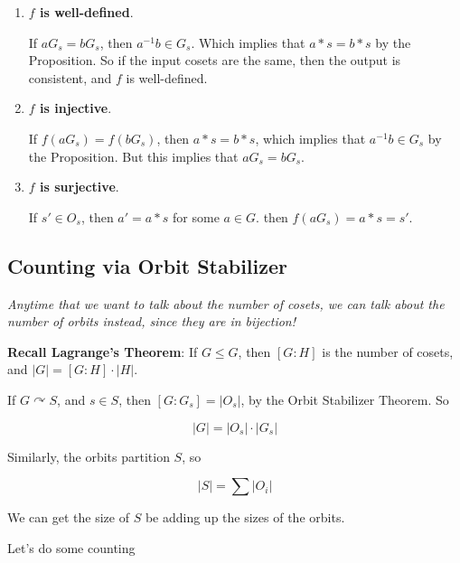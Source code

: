 \documentclass[12pt]{article}
\def\acts{\curvearrowright}
\begin{document}
\begin{enumerate}
  \item {\bf $f$ is  well-defined}.

    If $aG_s = b G_s$, then $a^{-1} b \in G_s$. Which implies that $a * s = b *
    s$ by the Proposition. So if the input cosets are the same, then the output
    is consistent, and $f$ is well-defined.

  \item {\bf $f$ is injective}.

    If $f(aG_s) = f(b G_s)$, then $a * s = b * s$, which implies that $a^{-1}b
    \in G_s$ by the Proposition. But this implies that $aG_s = b G_s$.

  \item {\bf $f$ is surjective}.

    If $s' \in O_s$, then $a' = a * s$ for some $a \in G$. then $f(a G_s) = a *
    s = s'$.
\end{enumerate}

\subsection{Counting via Orbit Stabilizer}

{\it Anytime that we want to talk about the number of cosets, we can talk about the
number of orbits instead, since they are in bijection!}

{\bf Recall Lagrange's Theorem}: If $G \le G$, then $[G : H]$ is the number of
cosets, and $|G| = [G : H] \cdot |H|$.

If $G \acts S$, and $s \in S$, then $[G : G_s] = |O_s|$, by the Orbit Stabilizer
Theorem. So

\[
  |G| = |O_s| \cdot |G_s|
\]

Similarly, the orbits partition $S$, so

\[
  |S| = \sum |O_i|
\]

We can get the size of $S$ be adding up the sizes of the orbits.

Let's do some counting

\end{document}
